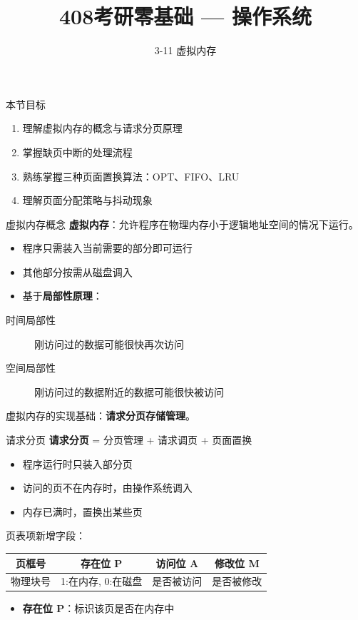 \documentclass[10pt, aspectratio=169]{beamer}
\title{408考研零基础 --- 操作系统}
\subtitle{3-11 虚拟内存}
\author{}
\date{}
\begin{document}
\begin{frame}{本节目标}
    \begin{enumerate}
        \item 理解虚拟内存的概念与请求分页原理
        \item 掌握缺页中断的处理流程
        \item 熟练掌握三种页面置换算法：OPT、FIFO、LRU
        \item 理解页面分配策略与抖动现象
    \end{enumerate}
\end{frame}

\begin{frame}{虚拟内存概念}
    \textbf{虚拟内存}：允许程序在物理内存小于逻辑地址空间的情况下运行。
    \vspace{0.5em}
    \begin{itemize}
        \item 程序只需装入当前需要的部分即可运行
        \item 其他部分按需从磁盘调入
        \item 基于\textbf{局部性原理}：
    \end{itemize}
    \begin{description}
        \item[时间局部性] 刚访问过的数据可能很快再次访问
        \item[空间局部性] 刚访问过的数据附近的数据可能很快被访问
    \end{description}
    \vspace{0.5em}
    虚拟内存的实现基础：\textbf{请求分页存储管理}。
\end{frame}

\begin{frame}{请求分页}
    \textbf{请求分页} = 分页管理 + 请求调页 + 页面置换
    \vspace{0.5em}
    \begin{itemize}
        \item 程序运行时只装入部分页
        \item 访问的页不在内存时，由操作系统调入
        \item 内存已满时，置换出某些页
    \end{itemize}
    \vspace{0.5em}
    页表项新增字段：
    \begin{center}
        \begin{tabular}{|c|c|c|c|}
            \hline
            页框号 & \textbf{存在位 P} & 访问位 A & 修改位 M \\
            \hline
            物理块号 & 1:在内存, 0:在磁盘 & 是否被访问 & 是否被修改 \\
            \hline
        \end{tabular}
    \end{center}
    \begin{itemize}
        \item \textbf{存在位 P}：标识该页是否在内存中
    \end{itemize}
\end{frame}
\end{document}
